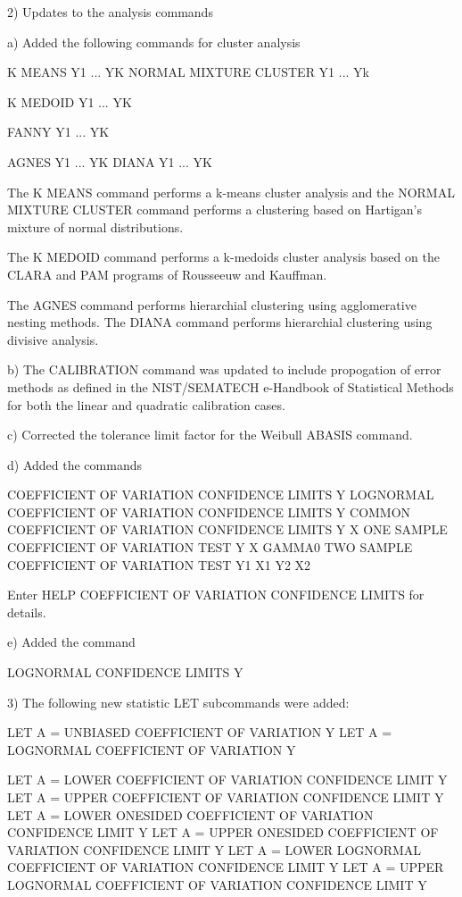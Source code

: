  2) Updates to the analysis commands

    a) Added the following commands for cluster analysis

          K MEANS Y1 ... YK
          NORMAL MIXTURE CLUSTER Y1 ... Yk

          K MEDOID Y1 ... YK

          FANNY Y1 ... YK

          AGNES Y1 ... YK
          DIANA Y1 ... YK

       The K MEANS command performs a k-means cluster analysis and the
       NORMAL MIXTURE CLUSTER command performs a clustering based on
       Hartigan's mixture of normal distributions.

       The K MEDOID command performs a k-medoids cluster analysis based
       on the CLARA and PAM programs of Rousseeuw and Kauffman.

       The AGNES command performs hierarchial clustering using
       agglomerative nesting methods.  The DIANA command performs
       hierarchial clustering using divisive analysis.

    b) The CALIBRATION command was updated to include propogation of error
       methods as defined in the NIST/SEMATECH e-Handbook of Statistical
       Methods for both the linear and quadratic calibration cases.

    c) Corrected the tolerance limit factor for the Weibull ABASIS
       command.

    d) Added the commands

           COEFFICIENT OF VARIATION CONFIDENCE LIMITS Y
           LOGNORMAL COEFFICIENT OF VARIATION CONFIDENCE LIMITS Y
           COMMON COEFFICIENT OF VARIATION CONFIDENCE LIMITS Y X
           ONE SAMPLE COEFFICIENT OF VARIATION TEST Y X GAMMA0
           TWO SAMPLE COEFFICIENT OF VARIATION TEST Y1 X1 Y2 X2

       Enter HELP COEFFICIENT OF VARIATION CONFIDENCE LIMITS for
       details.

    e) Added the command

           LOGNORMAL CONFIDENCE LIMITS Y

 3) The following new statistic LET subcommands were added:

       LET A = UNBIASED COEFFICIENT OF VARIATION Y
       LET A = LOGNORMAL COEFFICIENT OF VARIATION Y

       LET A = LOWER COEFFICIENT OF VARIATION CONFIDENCE LIMIT Y
       LET A = UPPER COEFFICIENT OF VARIATION CONFIDENCE LIMIT Y
       LET A = LOWER ONESIDED COEFFICIENT OF VARIATION CONFIDENCE LIMIT Y
       LET A = UPPER ONESIDED COEFFICIENT OF VARIATION CONFIDENCE LIMIT Y
       LET A = LOWER LOGNORMAL COEFFICIENT OF VARIATION CONFIDENCE LIMIT Y
       LET A = UPPER LOGNORMAL COEFFICIENT OF VARIATION CONFIDENCE LIMIT Y

